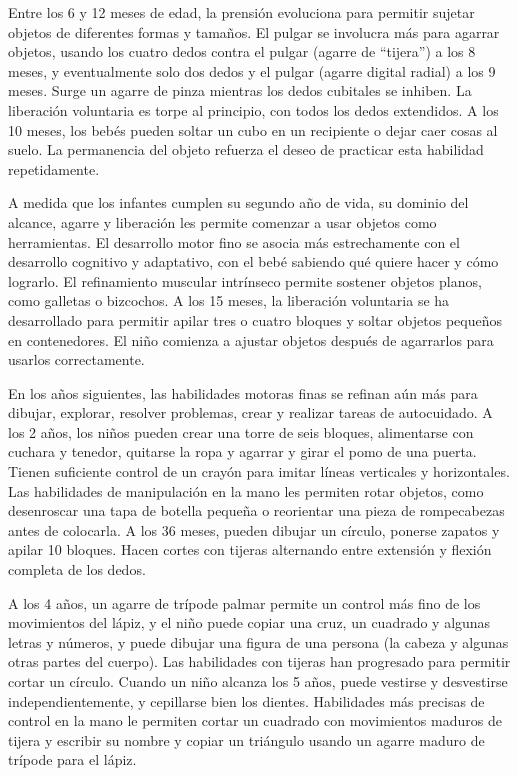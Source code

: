 \documentclass[11pt,letterpaper]{report}
\begin{document}
Entre los 6 y 12 meses de edad, la prensión evoluciona para permitir sujetar
objetos de diferentes formas y tamaños. El pulgar se involucra más para agarrar
objetos, usando los cuatro dedos contra el pulgar (agarre de ``tijera'') a los
8 meses, y eventualmente solo dos dedos y el pulgar (agarre digital radial) a
los 9 meses. Surge un agarre de pinza mientras los dedos cubitales se inhiben.
La liberación voluntaria es torpe al principio, con todos los dedos extendidos.
A los 10 meses, los bebés pueden soltar un cubo en un recipiente o dejar caer
cosas al suelo. La permanencia del objeto refuerza el deseo de practicar esta
habilidad repetidamente. \cite{Gerber2010}

A medida que los infantes cumplen su segundo año de vida, su dominio del
alcance, agarre y liberación les permite comenzar a usar objetos como
herramientas. El desarrollo motor fino se asocia más estrechamente con el
desarrollo cognitivo y  adaptativo, con el bebé sabiendo qué quiere hacer y
cómo lograrlo. El refinamiento muscular intrínseco permite sostener objetos
planos, como galletas o bizcochos. A los 15 meses, la liberación voluntaria se
ha desarrollado para permitir apilar tres o cuatro bloques y soltar objetos
pequeños en contenedores. El niño comienza a ajustar objetos después de
agarrarlos para usarlos correctamente. \cite{Gerber2010}

En los años siguientes, las habilidades motoras finas se refinan aún más para
dibujar, explorar, resolver problemas, crear y realizar tareas de autocuidado.
A los 2 años, los niños pueden crear una torre de seis bloques, alimentarse con
cuchara y tenedor, quitarse la ropa y agarrar y girar el pomo de una puerta.
Tienen suficiente control de un crayón para imitar líneas verticales y
horizontales. Las habilidades de manipulación en la mano les permiten rotar
objetos, como desenroscar una tapa de botella pequeña o reorientar una pieza de
rompecabezas antes de colocarla. A los 36 meses, pueden dibujar un círculo,
ponerse zapatos y apilar 10 bloques. Hacen cortes con tijeras alternando entre
extensión y flexión completa de los dedos. \cite{Gerber2010}

A los 4 años, un agarre de trípode palmar permite un control más fino de los
movimientos del lápiz, y el niño puede copiar una cruz, un cuadrado y algunas
letras y números, y puede dibujar una figura de una persona (la cabeza y
algunas otras partes del cuerpo). Las habilidades con tijeras han progresado
para permitir cortar un círculo. Cuando un niño alcanza los 5 años, puede
vestirse y desvestirse independientemente, y cepillarse bien los dientes.
Habilidades más precisas de control en la mano le permiten cortar un cuadrado
con movimientos maduros de tijera y escribir su nombre y copiar un triángulo
usando un agarre maduro de trípode para el lápiz.
\cite{Gerber2010}
\end{document}
